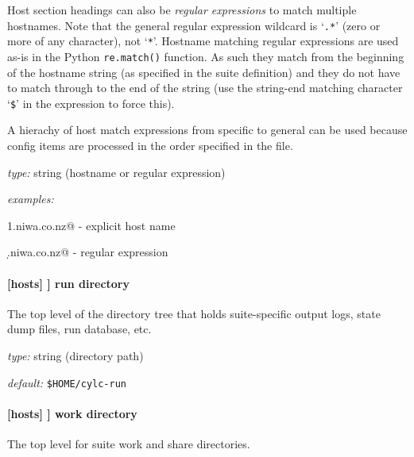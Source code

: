 Host section headings can also be {\em regular expressions} to match
multiple hostnames.  Note that the general regular expression wildcard
is `\lstinline=.*=' (zero or more of any character), not
`\lstinline=*='.
Hostname matching regular expressions are used as-is in the Python
\lstinline=re.match()= function. As such they match from the beginning
of the hostname string (as specified in the suite definition) and they
do not have to match through to the end of the string (use the
string-end matching character `\lstinline=$=' in the expression to
force this).

A hierachy of host match expressions from specific to general can be
used because config items are processed in the order specified in the
file.

\begin{myitemize}
\item {\em type:} string (hostname or regular expression)
\item {\em examples:}
\begin{myitemize}
    \item \lstinline@server1.niwa.co.nz@ - explicit host name
    \item  \lstinline@server\d.niwa.co.nz@ - regular expression
\end{myitemize}
\end{myitemize}

\paragraph[run directory]{[hosts] \textrightarrow [[HOST]] \textrightarrow run directory }

The top level of the directory tree that holds suite-specific output logs,
state dump files, run database, etc.

\begin{myitemize}
\item {\em type:} string (directory path)
\item {\em default:} \lstinline=$HOME/cylc-run=
\end{myitemize}

\paragraph[work directory]{[hosts] \textrightarrow [[HOST]] \textrightarrow work directory }
\label{workdirectory}

The top level for suite work and share directories.

